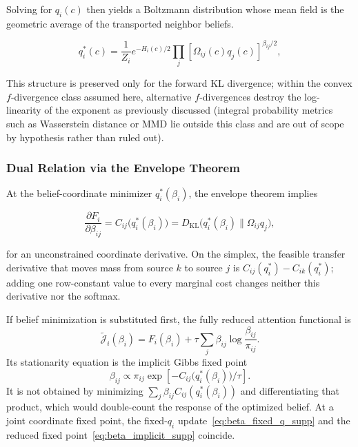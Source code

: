 \documentclass[twoside,11pt]{article}
\begin{document}
Solving for $q_i(c)$ then yields a Boltzmann distribution whose mean field is the geometric average of the transported neighbor beliefs.

\begin{equation}
q_i^*(c)
= \frac{1}{Z_i}
e^{-H_i(c)/2}
\prod_j
[\Omega_{ij}(c) q_j(c)]^{\beta_{ij}/2},
\label{eq:q_i_star_supp}
\end{equation}

This structure is preserved only for the forward KL divergence; within the convex $f$-divergence class assumed here, alternative $f$-divergences destroy the log-linearity of the exponent as previously discussed (integral probability metrics such as Wasserstein distance or MMD lie outside this class and are out of scope by hypothesis rather than ruled out).

\subsubsection{Dual Relation via the Envelope Theorem}
At the belief-coordinate minimizer $q_i^*(\beta_i)$, the envelope theorem implies

\begin{equation}
\frac{\partial F_i}{\partial \beta_{ij}}
= C_{ij}\bigl(q_i^*(\beta_i)\bigr)
= D_{\mathrm{KL}}\bigl(q_i^*(\beta_i) \| \Omega_{ij}q_j\bigr),
\label{eq:envelope_supp}
\end{equation}

for an unconstrained coordinate derivative. On the simplex, the feasible transfer derivative that moves mass from source $k$ to source $j$ is $C_{ij}(q_i^*)-C_{ik}(q_i^*)$; adding one row-constant value to every marginal cost changes neither this derivative nor the softmax.

If belief minimization is substituted first, the fully reduced attention functional is
\begin{equation}
\widetilde{\mathcal J}_i(\beta_i)
=F_i(\beta_i)+\tau\sum_j\beta_{ij}\log\frac{\beta_{ij}}{\pi_{ij}}.
\label{eq:J_reduced_beta_supp}
\end{equation}
Its stationarity equation is the implicit Gibbs fixed point
\begin{equation}
\beta_{ij}
\propto \pi_{ij}\exp\left[-C_{ij}\bigl(q_i^*(\beta_i)\bigr)/\tau\right].
\label{eq:beta_implicit_supp}
\end{equation}
It is not obtained by minimizing $\sum_j\beta_{ij}C_{ij}(q_i^*(\beta_i))$ and differentiating that product, which would double-count the response of the optimized belief. At a joint coordinate fixed point, the fixed-$q_i$ update~\eqref{eq:beta_fixed_q_supp} and the reduced fixed point~\eqref{eq:beta_implicit_supp} coincide.
\end{document}
